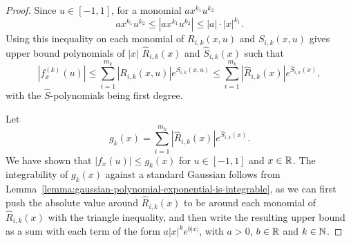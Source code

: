 \documentclass{article}
\theoremstyle{plain}
\theoremstyle{definition}
\theoremstyle{remark}
\begin{document}
\begin{proof}
    Since $u\in [-1, 1]$, for a monomial $ax^{k_1}u^{k_2}$
    \begin{equation}
        ax^{k_1}u^{k_2} \leq |ax^{k_1}u^{k_2}| \leq |a|\cdot |x|^{k_1}.
    \end{equation}
    Using this inequality on each monomial of $R_{i,k}(x, u)$ and $S_{i,k}(x, u)$ gives upper 
    bound polynomials of $|x|$ $\hat{R}_{i,k}(x)$ and $\hat{S}_{i,k}(x)$ such that 
    \begin{equation}
        |f_x^{(k)}(u)|
        \leq \sum_{i=1}^{m_k} |R_{i,k}(x, u)|e^{S_{i,k}(x, u)}
        \leq \sum_{i=1}^{m_k} |\hat{R}_{i,k}(x)|e^{\hat{S}_{i,k}(x)},
    \end{equation}
    with the $\hat{S}$-polynomials being first degree.

    Let 
    \begin{equation}
        g_k(x) = \sum_{i=1}^{m_k} |\hat{R}_{i,k}(x)|e^{\hat{S}_{i,k}(x)}.
    \end{equation}
    We have shown that $|f_x(u)| \leq g_k(x)$ for $u\in [-1, 1]$ and $x\in \mathbb{R}$.
    The integrability of $g_k(x)$ against a standard Gaussian follows from 
    Lemma~\ref{lemma:gaussian-polynomial-exponential-is-integrable},
    as we can first push the absolute value around $\hat{R}_{i,k}(x)$ to be
    around each monomial of $\hat{R}_{i,k}(x)$ with the triangle inequality,
    and then write the resulting upper bound as a sum with each term of the form 
    $a|x|^ke^{b|x|}$, with $a > 0$, $b\in \mathbb{R}$ and $k\in \mathbb{N}$.
\end{proof}
\end{document}
